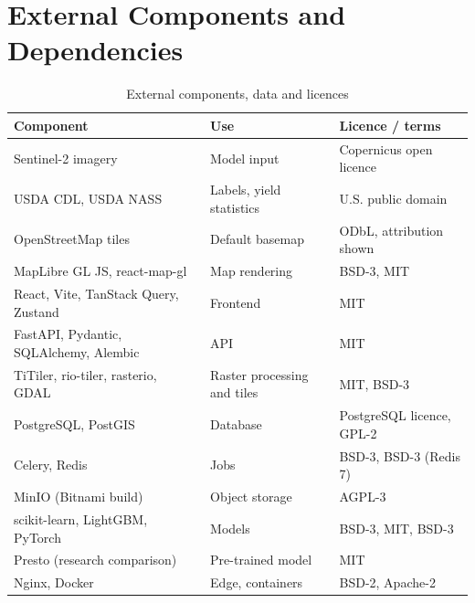 \section{External Components and Dependencies}\label{sec:external}
\begin{table}[htbp]
\centering\small
\caption{External components, data and licences}
\label{tab:external}
\begin{tabularx}{\textwidth}{L{3.6cm} Y L{3.0cm}}
\toprule
\textbf{Component} & \textbf{Use} & \textbf{Licence / terms}\\
\midrule
Sentinel-2 imagery & Model input & Copernicus open licence\\
USDA CDL, USDA NASS & Labels, yield statistics & U.S. public domain\\
OpenStreetMap tiles & Default basemap & ODbL, attribution shown\\
MapLibre GL JS, react-map-gl & Map rendering & BSD-3, MIT\\
React, Vite, TanStack Query, Zustand & Frontend & MIT\\
FastAPI, Pydantic, SQLAlchemy, Alembic & API & MIT\\
TiTiler, rio-tiler, rasterio, GDAL & Raster processing and tiles & MIT, BSD-3\\
PostgreSQL, PostGIS & Database & PostgreSQL licence, GPL-2\\
Celery, Redis & Jobs & BSD-3, BSD-3 (Redis 7)\\
MinIO (Bitnami build) & Object storage & AGPL-3\\
scikit-learn, LightGBM, PyTorch & Models & BSD-3, MIT, BSD-3\\
Presto (research comparison) & Pre-trained model & MIT\\
Nginx, Docker & Edge, containers & BSD-2, Apache-2\\
\bottomrule
\end{tabularx}
\end{table}

